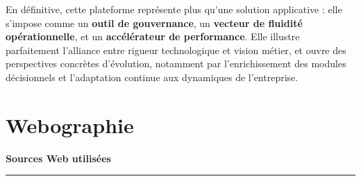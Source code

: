 \documentclass[a4paper,11pt]{report}
\begin{document}
\vspace{0.4cm}
\noindent
En définitive, cette plateforme représente plus qu’une solution applicative : elle s’impose comme un \textbf{outil de gouvernance}, un \textbf{vecteur de fluidité opérationnelle}, et un \textbf{accélérateur de performance}. Elle illustre parfaitement l’alliance entre rigueur technologique et vision métier, et ouvre des perspectives concrètes d’évolution, notamment par l’enrichissement des modules décisionnels et l’adaptation continue aux dynamiques de l’entreprise.




\newpage
\chapter*{Webographie}
\thispagestyle{empty}

\vspace{1cm}

\begin{center}
    {\LARGE\bfseries Sources Web utilisées}\\[0.5em]
    \textcolor{gray!70}{\rule{0.9\textwidth}{0.6pt}}
\end{center}

\vspace{1.5em}
\end{document}

